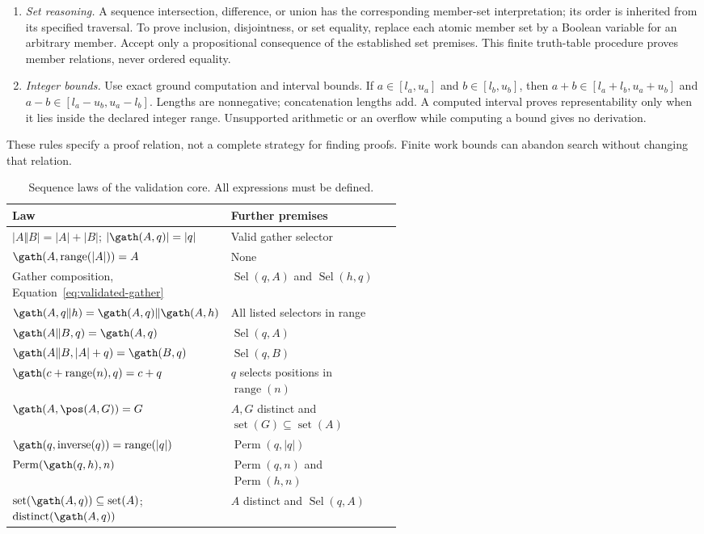 \begin{enumerate}
\item \emph{Set reasoning.} A sequence intersection, difference, or union
has the corresponding member-set interpretation; its order is inherited
from its specified traversal. To prove inclusion, disjointness, or set
equality, replace each atomic member set by a Boolean variable for an
arbitrary member. Accept only a propositional consequence of the
established set premises. This finite truth-table procedure proves member
relations, never ordered equality.
\item \emph{Integer bounds.} Use exact ground computation and interval
bounds. If $a\in[l_a,u_a]$ and $b\in[l_b,u_b]$, then
$a+b\in[l_a+l_b,u_a+u_b]$ and
$a-b\in[l_a-u_b,u_a-l_b]$. Lengths are nonnegative;
concatenation lengths add. A computed interval proves representability
only when it lies inside the declared integer range. Unsupported arithmetic
or an overflow while computing a bound gives no derivation.
\end{enumerate}
These rules specify a proof relation, not a complete strategy for finding
proofs. Finite work bounds can abandon search without changing that relation.

\begin{table}[!htbp]
\caption{Sequence laws of the validation core. All expressions must be defined.}
\label{tab:core-sequence-laws}
\small
\begin{tabularx}{\linewidth}{@{}p{0.56\linewidth}Y@{}}\toprule
Law & Further premises\\\midrule
$|A\Vert B|=|A|+|B|$; $|\gath(A,q)|=|q|$
& Valid gather selector\\
$\gath(A,\operatorname{range}(|A|))=A$
& None\\
Gather composition, Equation~\eqref{eq:validated-gather}
& $\operatorname{Sel}(q,A)$ and $\operatorname{Sel}(h,q)$\\
$\gath(A,q\Vert h)=\gath(A,q)\Vert\gath(A,h)$
& All listed selectors in range\\
$\gath(A\Vert B,q)=\gath(A,q)$
& $\operatorname{Sel}(q,A)$\\
$\gath(A\Vert B,|A|+q)=\gath(B,q)$
& $\operatorname{Sel}(q,B)$\\
$\gath(c+\operatorname{range}(n),q)=c+q$
& $q$ selects positions in $\operatorname{range}(n)$\\
$\gath(A,\pos(A,G))=G$
& $A,G$ distinct and $\operatorname{set}(G)\subseteq\operatorname{set}(A)$\\
$\gath(q,\operatorname{inverse}(q))=\operatorname{range}(|q|)$
& $\operatorname{Perm}(q,|q|)$\\
$\operatorname{Perm}(\gath(q,h),n)$
& $\operatorname{Perm}(q,n)$ and $\operatorname{Perm}(h,n)$\\
$\operatorname{set}(\gath(A,q))\subseteq\operatorname{set}(A)$;
$\operatorname{distinct}(\gath(A,q))$
& $A$ distinct and $\operatorname{Sel}(q,A)$\\\bottomrule
\end{tabularx}
\end{table}

